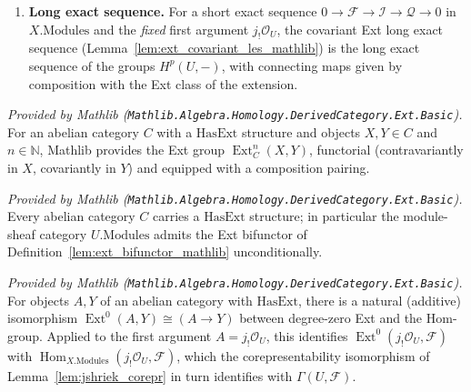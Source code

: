 \begin{definition}
\begin{enumerate}
    Lemma~\ref{lem:ext_eq_zero_of_injective_mathlib}. Since \(\mathcal{I}\) is exactly
    the second argument of \(\operatorname{Ext}^{n+1}(j_!\mathcal{O}_U, \mathcal{I})\),
    this yields \(H^{n+1}(U, \mathcal{I}) = 0\) directly: the short exact sequence stays
    in \(X.\mathrm{Modules}\), no restriction is taken, and
    restriction-preserves-injectives is not needed.
  \item \textbf{Long exact sequence.} For a short exact sequence \(0 \to \mathcal{F}
    \to \mathcal{I} \to \mathcal{Q} \to 0\) in \(X.\mathrm{Modules}\) and the
    \emph{fixed} first argument \(j_!\mathcal{O}_U\), the covariant Ext long exact
    sequence (Lemma~\ref{lem:ext_covariant_les_mathlib}) is the long exact sequence of
    the groups \(H^p(U, -)\), with connecting maps given by composition with the Ext
    class of the extension.
  \end{enumerate}
\end{definition}

\begin{definition}
  \label{lem:ext_bifunctor_mathlib}
  \mathlibok
  \textit{Provided by Mathlib
  (\texttt{Mathlib.Algebra.Homology.DerivedCategory.Ext.Basic}).}
  For an abelian category \(C\) with a \(\mathrm{HasExt}\) structure and objects \(X, Y
  \in C\) and \(n \in \mathbb{N}\), Mathlib provides the Ext group
  \(\operatorname{Ext}^n_C(X, Y)\), functorial (contravariantly in \(X\), covariantly in
  \(Y\)) and equipped with a composition pairing.
\end{definition}

\begin{lemma}
  \label{lem:hasext_standard_mathlib}
  \mathlibok
  \textit{Provided by Mathlib
  (\texttt{Mathlib.Algebra.Homology.DerivedCategory.Ext.Basic}).}
  Every abelian category \(C\) carries a \(\mathrm{HasExt}\) structure; in particular the
  module-sheaf category \(U.\mathrm{Modules}\) admits the Ext bifunctor of
  Definition~\ref{lem:ext_bifunctor_mathlib} unconditionally.
\end{lemma}

\begin{lemma}
  \label{lem:ext_homequiv_zero_mathlib}
  \mathlibok
  \textit{Provided by Mathlib
  (\texttt{Mathlib.Algebra.Homology.DerivedCategory.Ext.Basic}).}
  For objects \(A, Y\) of an abelian category with \(\mathrm{HasExt}\), there is a
  natural (additive) isomorphism \(\operatorname{Ext}^0(A, Y) \cong (A \to Y)\) between
  degree-zero Ext and the Hom-group. Applied to the first argument \(A =
  j_!\mathcal{O}_U\), this identifies \(\operatorname{Ext}^0(j_!\mathcal{O}_U,
  \mathcal{F})\) with
  \(\operatorname{Hom}_{X.\mathrm{Modules}}(j_!\mathcal{O}_U, \mathcal{F})\), which the
  corepresentability isomorphism of Lemma~\ref{lem:jshriek_corepr} in turn identifies
  with \(\Gamma(U, \mathcal{F})\).
\end{lemma}

